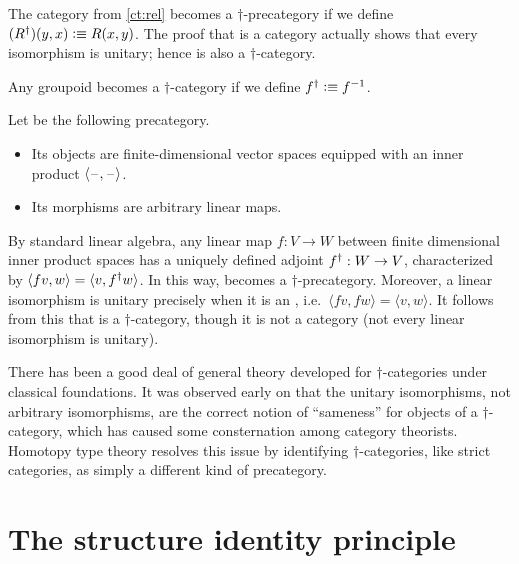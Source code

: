 \begin{eg}\label{ct:rel-dagger-cat}
  The category \urel from \cref{ct:rel} becomes a $\dagger$-pre\-cat\-e\-go\-ry if we define $({R}^{\dagger})(y,x) \vcentcolon\equiv R(x,y)$.
  The proof that \urel is a category actually shows that every isomorphism is unitary; hence \urel is also a $\dagger$-category.
\end{eg}

\begin{eg}\label{ct:groupoid-dagger-cat}
  Any groupoid becomes a $\dagger$-category if we define ${f}^{\dagger} \vcentcolon\equiv {f}^{-1}$.
\end{eg}

\begin{eg}\label{ct:hilb}
  Let \uhilb be the following precategory.
  \begin{itemize}
  \item Its objects are finite-dimensional  vector spaces equipped with an inner product $\langle \mathord{\hspace{1pt}\text{--}\hspace{1pt}},\mathord{\hspace{1pt}\text{--}\hspace{1pt}}\rangle$.
  \item Its morphisms are arbitrary linear maps.
  \end{itemize}
  By standard linear algebra, any linear map $f:V\to W$ between finite
  dimensional inner product spaces has a uniquely defined adjoint ${f}^{\dagger}:W\to V$, characterized by $\langle f v,w\rangle = \langle v,{f}^{\dagger} w\rangle$.
  In this way, \uhilb becomes a $\dagger$-precategory.
  Moreover, a linear isomorphism is unitary precisely when it is an ,
  i.e.\ $\langle fv,fw\rangle = \langle v,w\rangle$.
  It follows from this that \uhilb is a $\dagger$-category, though it is not a category (not every linear isomorphism is unitary).
\end{eg}

There has been a good deal of general theory developed for $\dagger$-cat\-e\-gor\-ies under classical foundations.
It was observed early on that the unitary isomorphisms, not arbitrary isomorphisms, are the correct notion of ``sameness'' for objects of a $\dagger$-category, which has caused some consternation among category theorists.
Homotopy type theory resolves this issue by identifying $\dagger$-categories, like strict categories, as simply a different kind of precategory.


\section{The structure identity principle}
\label{sec:sip}

